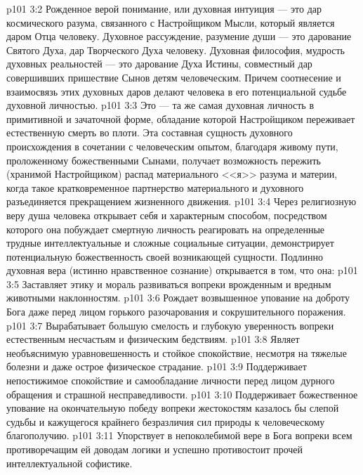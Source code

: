\vs p101 3:2 Рожденное верой понимание, или духовная интуиция --- это дар космического разума, связанного с Настройщиком Мысли, который является даром Отца человеку. Духовное рассуждение, разумение души --- это дарование Святого Духа, дар Творческого Духа человеку. Духовная философия, мудрость духовных реальностей --- это дарование Духа Истины, совместный дар совершивших пришествие Сынов детям человеческим. Причем соотнесение и взаимосвязь этих духовных даров делают человека в его потенциальной судьбе духовной личностью.
\vs p101 3:3 Это --- та же самая духовная личность в примитивной и зачаточной форме, обладание которой Настройщиком переживает естественную смерть во плоти. Эта составная сущность духовного происхождения в сочетании с человеческим опытом, благодаря живому пути, проложенному божественными Сынами, получает возможность пережить (хранимой Настройщиком) распад материального <<я>> разума и материи, когда такое кратковременное партнерство материального и духовного разъединяется прекращением жизненного движения.
\vs p101 3:4 Через религиозную веру душа человека открывает себя и характерным способом, посредством которого она побуждает смертную личность реагировать на определенные трудные интеллектуальные и сложные социальные ситуации, демонстрирует потенциальную божественность своей возникающей сущности. Подлинно духовная вера (истинно нравственное сознание) открывается в том, что она:
\vs p101 3:5 \bibnobreakspace Заставляет этику и мораль развиваться вопреки врожденным и вредным животными наклонностям.
\vs p101 3:6 \bibnobreakspace Рождает возвышенное упование на доброту Бога даже перед лицом горького разочарования и сокрушительного поражения.
\vs p101 3:7 \bibnobreakspace Вырабатывает большую смелость и глубокую уверенность вопреки естественным несчастьям и физическим бедствиям.
\vs p101 3:8 \bibnobreakspace Являет необъяснимую уравновешенность и стойкое спокойствие, несмотря на тяжелые болезни и даже острое физическое страдание.
\vs p101 3:9 \bibnobreakspace Поддерживает непостижимое спокойствие и самообладание личности перед лицом дурного обращения и страшной несправедливости.
\vs p101 3:10 \bibnobreakspace Поддерживает божественное упование на окончательную победу вопреки жестокостям казалось бы слепой судьбы и кажущегося крайнего безразличия сил природы к человеческому благополучию.
\vs p101 3:11 \bibnobreakspace Упорствует в непоколебимой вере в Бога вопреки всем противоречащим ей доводам логики и успешно противостоит прочей интеллектуальной софистике.
